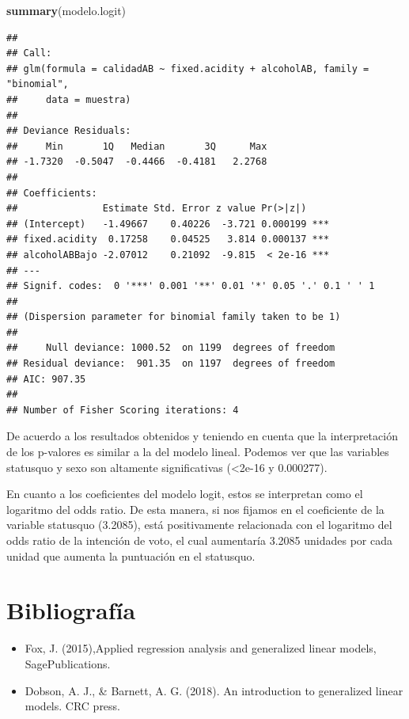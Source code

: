 \documentclass[
]{article}
\newenvironment{Shaded}{\begin{snugshade}}{\end{snugshade}}
\newcommand{\KeywordTok}[1]{\textcolor[rgb]{0.13,0.29,0.53}{\textbf{#1}}}
\newcommand{\NormalTok}[1]{#1}
\providecommand{\tightlist}{%
  \setlength{\itemsep}{0pt}\setlength{\parskip}{0pt}}
\begin{document}
\begin{Shaded}
\begin{Highlighting}[]
\KeywordTok{summary}\NormalTok{(modelo.logit)}
\end{Highlighting}
\end{Shaded}

\begin{verbatim}
## 
## Call:
## glm(formula = calidadAB ~ fixed.acidity + alcoholAB, family = "binomial", 
##     data = muestra)
## 
## Deviance Residuals: 
##     Min       1Q   Median       3Q      Max  
## -1.7320  -0.5047  -0.4466  -0.4181   2.2768  
## 
## Coefficients:
##               Estimate Std. Error z value Pr(>|z|)    
## (Intercept)   -1.49667    0.40226  -3.721 0.000199 ***
## fixed.acidity  0.17258    0.04525   3.814 0.000137 ***
## alcoholABBajo -2.07012    0.21092  -9.815  < 2e-16 ***
## ---
## Signif. codes:  0 '***' 0.001 '**' 0.01 '*' 0.05 '.' 0.1 ' ' 1
## 
## (Dispersion parameter for binomial family taken to be 1)
## 
##     Null deviance: 1000.52  on 1199  degrees of freedom
## Residual deviance:  901.35  on 1197  degrees of freedom
## AIC: 907.35
## 
## Number of Fisher Scoring iterations: 4
\end{verbatim}

De acuerdo a los resultados obtenidos y teniendo en cuenta que la
interpretación de los p-valores es similar a la del modelo lineal.
Podemos ver que las variables statusquo y sexo son altamente
significativas (\textless2e-16 y 0.000277).

En cuanto a los coeficientes del modelo logit, estos se interpretan como
el logaritmo del odds ratio. De esta manera, si nos fijamos en el
coeficiente de la variable statusquo (3.2085), está positivamente
relacionada con el logaritmo del odds ratio de la intención de voto, el
cual aumentaría 3.2085 unidades por cada unidad que aumenta la
puntuación en el statusquo.

\hypertarget{bibliografuxeda}{%
\section{Bibliografía}\label{bibliografuxeda}}

\begin{itemize}
\tightlist
\item
  Fox, J. (2015),Applied regression analysis and generalized linear
  models, SagePublications.
\item
  Dobson, A. J., \& Barnett, A. G. (2018). An introduction to
  generalized linear models. CRC press.
\end{itemize}
\end{document}
